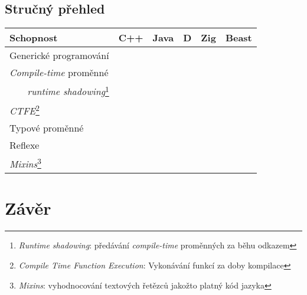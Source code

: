 \section{Stručný přehled}
\begin{tabular}{l||c|c|c|c||c}
	\textbf{Schopnost} & \textbf{C++} & \textbf{Java} & \textbf{D} & \textbf{Zig} & \textbf{Beast} \\
	\hline\hline
	Generické programování \\\hline
	\textit{Compile-time} proměnné \\
	\multicolumn{1}{r||}{\textit{runtime shadowing}\footnote{\textit{Runtime shadowing}: předávání \textit{compile-time} proměnných za běhu odkazem}} \\\hline
	\textit{CTFE}\footnote{\textit{Compile Time Function Execution}: Vykonávání funkcí za doby kompilace} \\\hline
	Typové proměnné \\\hline
	Reflexe \\\hline
	\textit{Mixins}\footnote{\textit{Mixins}: vyhodnocování textových řetězců jakožto platný kód jazyka} \\
\end{tabular}

\chapter{Závěr}